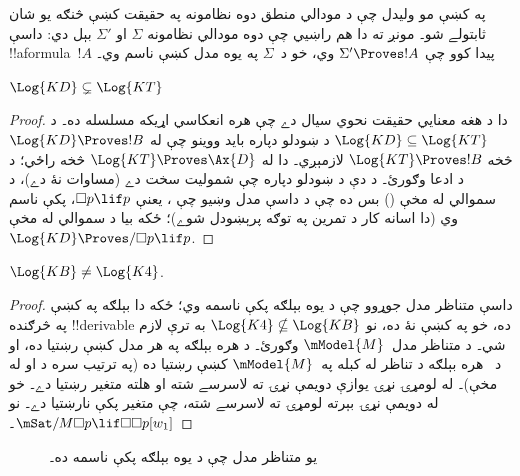 \documentclass[../../../include/open-logic-section]{subfiles}
\begin{document}


په  کښې مو وليدل چې د مودالي منطق دوه نظامونه
په حقيقت کښې څنګه يو شان ثابتولے شو۔  مونږ ته
دا هم راښيي چې دوه مودالي نظامونه $\Sigma$ او $\Sigma'$ بېل دي: داسې
!!a{formula}~$!A$ پيدا کوو چې $\Sigma' \Proves !A$ وي، خو د~$\Sigma$
په يوه مدل کښې ناسم وي۔

\begin{prop}
  $\Log{KD} \subsetneq \Log{KT}$
\end{prop}

\begin{proof} دا د هغه معنايي حقيقت نحوي سيال دے چې هره
  انعکاسي اړيکه مسلسله ده۔ د $\Log{KD} \subseteq
  \Log{KT}$ د ښودلو دپاره بايد ووينو چې له $\Log{KD} \Proves !B$
  څخه $\Log{KT} \Proves !B$ لازمېږي۔ دا له $\Log{KT} \Proves
  \Ax{D}$ څخه راځي؛ د  د
   ادعا وګورئ۔ د دې د ښودلو دپاره
  چې شموليت سخت دے (مساوات نۀ دے)، د سموالي له مخې
  () بس ده چې د  داسې مدل وښيو
  چې ، يعنې $\Box p \lif p$، پکې ناسم وي (دا اسانه کار
  د تمرين په توګه پرېښودل شوے)؛ ځکه بيا د سموالي له مخې $\Log{KD}
  \Proves/ \Box p \lif p$.
\end{proof}

\begin{prop}
  $\Log{KB} \neq \Log{K4}$. 
\end{prop}

\begin{proof}
  داسې متناظر مدل جوړوو چې د  يوه بېلګه پکې ناسمه وي؛ ځکه دا
  بېلګه په  کښې په څرګنده !!{derivable} ده، خو په 
  کښې نۀ ده، نو $\Log{K4} \nsubseteq \Log{KB}$ به ترې لازم شي۔
  د  متناظر مدل~$\mModel{M}$ وګورئ۔ د
   هره بېلګه په هر مدل کښې رښتيا ده، او د~ هره بېلګه
  د تناظر له کبله په~$\mModel{M}$ کښې رښتيا ده
  (په ترتيب سره د  او
   له مخې)۔ له لومړۍ نړۍ يوازې
  دويمې نړۍ ته لاسرسے شته او هلته متغير رښتيا دے۔ خو له دويمې
  نړۍ بېرته لومړۍ ته لاسرسے شته، چې متغير پکې نارښتيا دے۔ نو
  $\mSat/{M}{\Box p \lif \Box\Box p}[w_1]$۔
\end{proof}

\begin{figure}[htpb]
  \centering
  \caption{يو متناظر مدل چې د  يوه بېلګه پکې ناسمه ده۔}
\end{figure}
\end{document}
